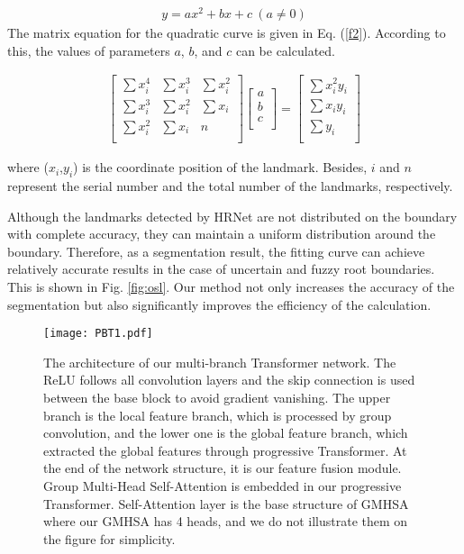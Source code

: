 \documentclass[journal]{IEEEtran}
\begin{document}
\begin{equation}
\begin{aligned}
y=ax^2 +bx+c\ (a\neq0)
\end{aligned}
\label{f1}
\end{equation}
The matrix equation for the quadratic curve is given in Eq. (\ref{f2}).
According to this, the values of parameters $a$, $b$, and $c$ can be calculated.

\begin{equation}
\begin{aligned}
\left[\begin{matrix}\sum x_i^4&\sum x_i^3&\sum x_i^2\\\sum x_i^3&\sum x_i^2&\sum x_i\\\sum x_i^2&\sum x_i&n\\\end{matrix}\right]\left[\begin{matrix}a\\b\\c\\\end{matrix}\right]=\left[\begin{matrix}\sum{x_i^2y_i}\\\sum{x_iy_i}\\\sum y_i\\\end{matrix}\right]
\end{aligned}
\label{f2}
\end{equation}

where ($x_i$,$y_i$) is the coordinate position of the landmark. Besides, $i$ and $n$ represent the serial number and the total number of the landmarks, respectively. 

Although the landmarks detected by HRNet are not distributed on the boundary with complete accuracy, they can maintain a uniform distribution around the boundary. Therefore, as a segmentation result, the fitting curve can achieve relatively accurate results in the case of uncertain and fuzzy root boundaries. This is shown in \textcolor[rgb]{0,0.541,0.855}{Fig. \ref{fig:osl}}. Our method not only increases the accuracy of the segmentation but also significantly improves the efficiency of the calculation.


\begin{figure*}[ht]
  \centering
  \texttt{[image: PBT1.pdf]}
  \caption{The architecture of our multi-branch Transformer network. The ReLU follows all convolution layers and the skip connection is used between the base block to avoid gradient vanishing. The upper branch is the local feature branch, which is processed by group convolution, and the lower one is the global feature branch, which extracted the global features through progressive Transformer. At the end of the network structure, it is our feature fusion module. Group Multi-Head Self-Attention is embedded in our progressive Transformer. Self-Attention layer is the base structure of GMHSA where our GMHSA has 4 heads, and we do not illustrate them on the figure for simplicity.}
  \label{fig:MBT}
\end{figure*}
\end{document}
